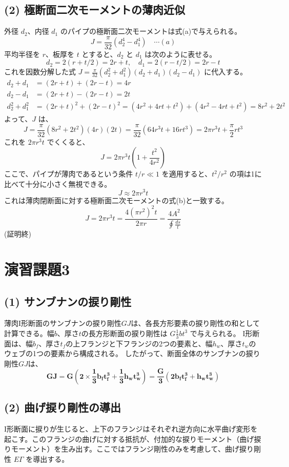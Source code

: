 \documentclass[a4j,12pt]{jsarticle}
\begin{document}
\subsection*{(2) 極断面二次モーメントの薄肉近似}
外径 $d_2$、内径 $d_1$ のパイプの極断面二次モーメントは式(a)で与えられる。
$$J = \frac{\pi}{32}(d_2^4 - d_1^4) \quad \cdots (a)$$
平均半径を $r$、板厚を $t$ とすると、$d_2$ と $d_1$ は次のように表せる。
$$d_2 = 2(r + t/2) = 2r+t, \quad d_1 = 2(r - t/2) = 2r-t$$
これを因数分解した式 $J = \frac{\pi}{32}(d_2^2+d_1^2)(d_2+d_1)(d_2-d_1)$ に代入する。
\begin{align*}
    d_2 + d_1 &= (2r+t) + (2r-t) = 4r \\
    d_2 - d_1 &= (2r+t) - (2r-t) = 2t \\
    d_2^2 + d_1^2 &= (2r+t)^2 + (2r-t)^2 = (4r^2+4rt+t^2) + (4r^2-4rt+t^2) = 8r^2 + 2t^2
\end{align*}
よって、$J$ は、
$$J = \frac{\pi}{32} (8r^2+2t^2)(4r)(2t) = \frac{\pi}{32} (64r^3 t + 16rt^3) = 2\pi r^3 t + \frac{\pi}{2}rt^3$$
これを $2\pi r^3 t$ でくくると、
$$J = 2\pi r^3 t \left(1 + \frac{t^2}{4r^2}\right)$$
ここで、パイプが薄肉であるという条件 $t/r \ll 1$ を適用すると、$t^2/r^2$ の項は1に比べて十分に小さく無視できる。
$$J \approx 2\pi r^3 t$$
これは薄肉閉断面に対する極断面二次モーメントの式(b)と一致する。
$$J = 2\pi r^3 t = \frac{4(\pi r^2)^2 t}{2\pi r} = \frac{4A^2}{\oint \frac{ds}{t}}$$
(証明終)

\newpage
\section*{演習課題3}
\subsection*{(1) サンブナンの捩り剛性}
薄肉I形断面のサンブナンの捩り剛性$GJ$は、各長方形要素の捩り剛性の和として計算できる。幅$b$、厚さ$t$の長方形断面の捩り剛性は $G \frac{1}{3}bt^3$ で与えられる。
I形断面は、幅$b_f$、厚さ$t_f$の上フランジと下フランジの2つの要素と、幅$h_w$、厚さ$t_w$のウェブの1つの要素から構成される。
したがって、断面全体のサンブナンの捩り剛性$GJ$は、
$$\boldsymbol{GJ = G \left( 2 \times \frac{1}{3} b_f t_f^3 + \frac{1}{3} h_w t_w^3 \right) = \frac{G}{3} (2 b_f t_f^3 + h_w t_w^3)}$$

\subsection*{(2) 曲げ捩り剛性の導出}
I形断面に捩りが生じると、上下のフランジはそれぞれ逆方向に水平曲げ変形を起こす。このフランジの曲げに対する抵抗が、付加的な捩りモーメント（曲げ捩りモーメント）を生み出す。ここではフランジ剛性のみを考慮して、曲げ捩り剛性 $E\Gamma$ を導出する。
\end{document}

